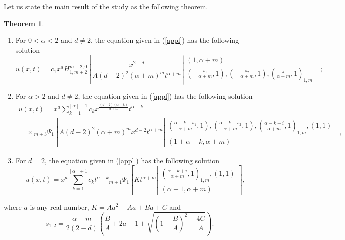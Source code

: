 \documentclass[12pt]{article}
\theoremstyle{definition}
\newtheorem{theorem}{Theorem}
\begin{document}
Let us state the main result of the study as the following theorem.
\begin{theorem}\label{main}
\begin{enumerate}
    \item For $0<\alpha<2$ and $d\neq 2$, the equation given in (\ref{appl}) has  the following solution
    \begin{equation}
    \label{nem1}
    u(x,t)=c_1x^aH_{1,m+2}^{m+2,0} \left[ \frac{x^{2-d}}{A(d-2)^2(\alpha+m)^{m}t^{\alpha+m}} \left| \begin{matrix}
( 1 , \alpha+m )  \\
\left( -\frac{s_1}{\alpha+m} , 1 \right) ,\left( -\frac{s_2}{\alpha+m} , 1 \right) , \left(\frac{j}{\alpha+m} , 1  \right)_{1,m}   \end{matrix}\right.\right];
    \end{equation}
    \item For $\alpha>2$ and $d\neq 2$, the equation given in (\ref{appl}) has the following solution
\begin{multline*}
u(x,t)= x^a\sum_{k=1}^{[\alpha]+1} c_kx^{\frac{(d-2)(\alpha-k)}{\alpha+m}}t^{\alpha-k}\\
   ~~~~~\times {}_{m+3}\Psi_1 \left[A(d-2)^2(\alpha+m)^{m}x^{d-2}t^{\alpha+m}\left|\begin{matrix}\left( \frac{\alpha-k-s_1}{\alpha+m} , 1 \right),\left( \frac{\alpha-k-s_2}{\alpha+m} , 1 \right) , \left(\frac{\alpha-k+i}{\alpha+m},1\right)_{1,m} , ( 1 , 1 )\\ 
( 1+\alpha-k , \alpha+m )  \end{matrix}\right.\right],
\end{multline*}

\item 
For $d= 2$, the equation given in (\ref{appl}) has the following solution
$$u(x,t)=x^a\sum_{k=1}^{[\alpha]+1} c_kt^{\alpha-k}{}_{m+1}\Psi_1 \left[Kt^{\alpha+m}\left|\begin{matrix} (\frac{\alpha-k+i}{\alpha+m},1)_{1,m} , ( 1 , 1 )\\ 
( \alpha-1 , \alpha+m )  \end{matrix}\right.\right],$$
\end{enumerate}
where $a$ is any real number, $K=Aa^2-Aa+Ba+C$ and
\begin{equation}
 s_{1,2}=\frac{\alpha+m}{2(2-d)}\left(\frac{B}{A}+2a-1\pm \sqrt{\left(1-\frac{B}{A}\right)^2-\frac{4C}{A}}\right).
\end{equation}
\end{theorem}
\end{document}
